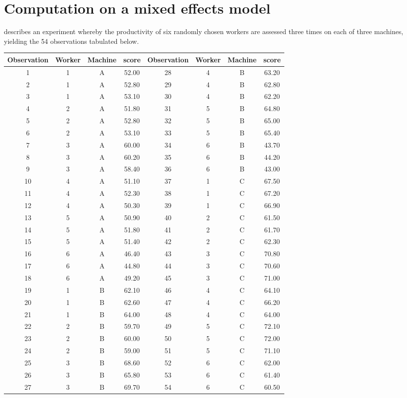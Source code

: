 \documentclass[12pt, a4paper]{report}
\theoremstyle{plain}
\theoremstyle{definition}
\theoremstyle{remark}
\begin{document}
\section{Computation on a mixed effects model}

\citet{pb} describes an experiment whereby the productivity of six
randomly chosen workers are assessed three times on each of three
machines, yielding the 54 observations tabulated below.

\begin{table}[h!]
	\begin{center}
		\begin{tabular}{|c|c|c|c||c|c|c|c|}
			\hline
			Observation & Worker & Machine & score & Observation & Worker & Machine & score \\
			\hline
			1 & 1 & A & 52.00 &	28 & 4 & B & 63.20 \\
			2 & 1 & A & 52.80 &	  29 & 4 & B & 62.80 \\
			3 & 1 & A & 53.10 &	  30 & 4 & B & 62.20 \\
			4 & 2 & A & 51.80 &	  31 & 5 & B & 64.80 \\
			5 & 2 & A & 52.80 &	  32 & 5 & B & 65.00 \\
			6 & 2 & A & 53.10 &	  33 & 5 & B & 65.40 \\
			7 & 3 & A & 60.00 &	  34 & 6 & B & 43.70 \\
			8 & 3 & A & 60.20 &	  35 & 6 & B & 44.20 \\
			9 & 3 & A & 58.40 &	  36 & 6 & B & 43.00 \\
			10 & 4 & A & 51.10 &	  37 & 1 & C & 67.50 \\
			11 & 4 & A & 52.30 &	  38 & 1 & C & 67.20 \\
			12 & 4 & A & 50.30 &	  39 & 1 & C & 66.90 \\
			13 & 5 & A & 50.90 &	  40 & 2 & C & 61.50 \\
			14 & 5 & A & 51.80 &	  41 & 2 & C & 61.70 \\
			15 & 5 & A & 51.40 &	  42 & 2 & C & 62.30 \\
			16 & 6 & A & 46.40 &	  43 & 3 & C & 70.80 \\
			17 & 6 & A & 44.80 &	  44 & 3 & C & 70.60 \\
			18 & 6 & A & 49.20 &	  45 & 3 & C & 71.00 \\
			19 & 1 & B & 62.10 &	  46 & 4 & C & 64.10 \\
			20 & 1 & B & 62.60 &	  47 & 4 & C & 66.20 \\
			21 & 1 & B & 64.00 &	  48 & 4 & C & 64.00 \\
			22 & 2 & B & 59.70 &	  49 & 5 & C & 72.10 \\
			23 & 2 & B & 60.00 &	  50 & 5 & C & 72.00 \\
			24 & 2 & B & 59.00 &	  51 & 5 & C & 71.10 \\
			25 & 3 & B & 68.60 &	  52 & 6 & C & 62.00 \\
			26 & 3 & B & 65.80 &	  53 & 6 & C & 61.40 \\
			27 & 3 & B & 69.70 &	  54 & 6 & C & 60.50 \\
			

\end{tabular}
\end{center}
\end{table}
\end{document}
